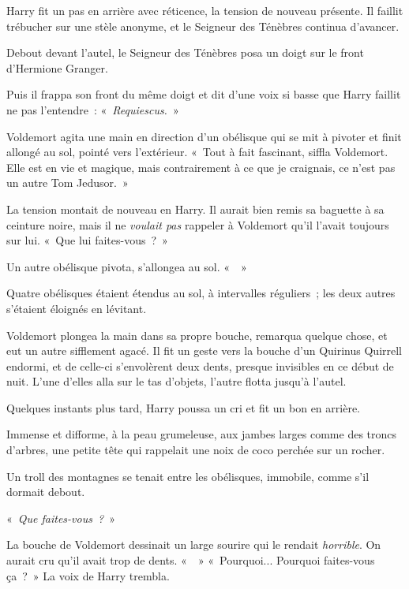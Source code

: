 Harry fit un pas en arrière avec réticence, la tension de nouveau présente. Il faillit trébucher sur une stèle anonyme, et le Seigneur des Ténèbres continua d'avancer.

Debout devant l'autel, le Seigneur des Ténèbres posa un doigt sur le front d'Hermione Granger.

Puis il frappa son front du même doigt et dit d'une voix si basse que Harry faillit ne pas l'entendre~: «~\emph{Requiescus.}~»

Voldemort agita une main en direction d'un obélisque qui se mit à pivoter et finit allongé au sol, pointé vers l'extérieur. «~Tout à fait fascinant, siffla Voldemort. Elle est en vie et magique, mais contrairement à ce que je craignais, ce n'est pas un autre Tom Jedusor.~»

La tension montait de nouveau en Harry. Il aurait bien remis sa baguette à sa ceinture noire, mais il ne \emph{voulait pas} rappeler à Voldemort qu'il l'avait toujours sur lui. «~Que lui faites-vous~?~»

Un autre obélisque pivota, s'allongea au sol. «~~»

Quatre obélisques étaient étendus au sol, à intervalles réguliers~; les deux autres s'étaient éloignés en lévitant.

Voldemort plongea la main dans sa propre bouche, remarqua quelque chose, et eut un autre sifflement agacé. Il fit un geste vers la bouche d'un Quirinus Quirrell endormi, et de celle-ci s'envolèrent deux dents, presque invisibles en ce début de nuit. L'une d'elles alla sur le tas d'objets, l'autre flotta jusqu'à l'autel.

Quelques instants plus tard, Harry poussa un cri et fit un bon en arrière.

Immense et difforme, à la peau grumeleuse, aux jambes larges comme des troncs d'arbres, une petite tête qui rappelait une noix de coco perchée sur un rocher.

Un troll des montagnes se tenait entre les obélisques, immobile, comme s'il dormait debout.

«~\emph{Que faites-vous~?}~»

La bouche de Voldemort dessinait un large sourire qui le rendait \emph{horrible}. On aurait cru qu'il avait trop de dents. «~~»
«~Pourquoi... Pourquoi faites-vous ça~?~» La voix de Harry trembla.

